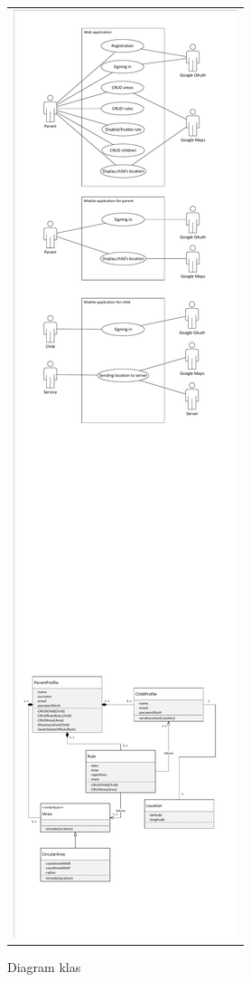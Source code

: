\documentclass{sprawozdanie-agh}
\begin{document}
		\begin{figure}[H]
			\centering
			\begin{tabular}{c}
				\includegraphics[width=.95\textwidth]{classes} 
			\end{tabular}
		\caption{Diagram klas}
		\end{figure}
	
\end{document}
